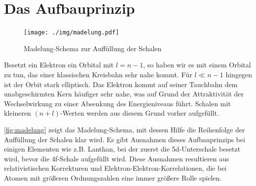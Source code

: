 \section{Das Aufbauprinzip}
\begin{figure}
	\centering
	\texttt{[image: ./img/madelung.pdf]}
	\caption{Madelung-Schema zur Auffüllung der Schalen}
	\label{fig:madelung}
\end{figure}
Besetzt ein Elektron ein Orbital mit $l=n-1$, so haben wir es mit einem Orbital zu tun, das einer klassischen Kreisbahn sehr nahe kommt.
Für $l\ll n-1$ hingegen ist der Orbit stark elliptisch.
Das Elektron kommt auf seiner Tauchbahn dem unabgeschirmten Kern häufiger sehr nahe, was auf Grund der Attraktivität der Wechselwirkung zu einer Absenkung des Energieniveaus führt.
Schalen mit kleineren $(n+l)$-Werten werden aus diesem Grund vorher aufgefüllt.

\autoref{fig:madelung} zeigt das Madelung-Schema, mit dessen Hilfe die Reihenfolge der Auffüllung der Schalen klar wird.
Es gibt Ausnahmen dieses Aufbauprinzips bei einigen Elementen wie z.B. Lanthan, bei der zuerst die 5d-Unterschale besetzt wird, bevor die 4f-Schale aufgefüllt wird.
Diese Ausnahmen resultieren aus relativistischen Korrekturen und Elektron-Elektron-Korrelationen, die bei Atomen mit größeren Ordnungszahlen eine immer größere Rolle spielen.

